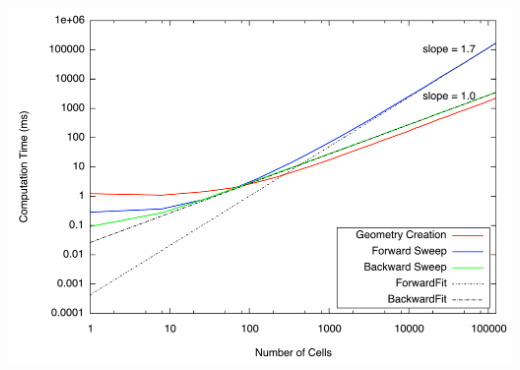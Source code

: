 \documentclass[color={usenames, dvipsnames},ignorenonframetext]{beamer}
\begin{document}
\begin{frame}
    \includegraphics[width=\textwidth, keepaspectratio]{MeshTiming}
\end{frame}
\end{document}
